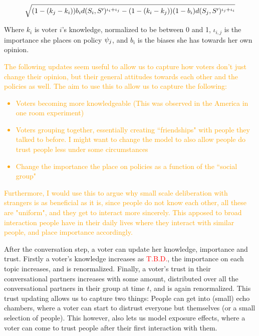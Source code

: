 \begin{equation}
	\label{eq:abm_update_function}
	\sqrt{
		(1-(k_j-k_i))b_id(S_i, S')^{\iota_i + \iota_j}
		-
		(1 - (k_i-k_j))(1-b_i)d(S_j, S')^{\iota_j + \iota_i}
	}
\end{equation}

Where $k_{i}$ is voter $i$'s knowledge, normalized to be between 0 and 1, $\iota_{i,j}$ is the importance she places on policy $\psi_{j}$, and $b_{i}$ is the biases she has towards her own opinion.

\textcolor{orange}{The following updates seem useful to allow us to capture how voters don't just change their opinion, but their general attitudes towards each other and the policies as well. The aim to use this to allow us to capture the following:}
\textcolor{orange}{
	\begin{itemize}
		\item Voters becoming more knowledgeable (This was observed in the America in one room experiment)
		\item Voters grouping together, essentially creating ``friendships" with people they talked to before. I might want to change the model to also allow people do trust people less under some circumstances
		\item Change the importance the place on policies as a function of the ``social group"
	\end{itemize}}

\textcolor{orange}{
	Furthermore, I would use this to argue why small scale deliberation with strangers is as beneficial as it is, since people do not know each other, all these are "uniform", and they get to interact more sincerely. This apposed to broad interaction people have in their daily lives where they interact with similar people, and place importance accordingly.
}

After the conversation step, a voter can update her knowledge, importance and trust. Firstly a voter's knowledge increases as \textcolor{red}{T.B.D.}, the importance on each topic increases, and is renormalized. Finally, a voter's trust in their conversational partners increases with some amount, distributed over all the conversational partners in their group at time $t$, and is again renormalized. This trust updating allows us to capture two things: People can get into (small) echo chambers, where a voter can start to distrust everyone but themselves (or a small selection of people). This however, also lets us model exposure effects, where a voter can come to trust people after their first interaction with them.

